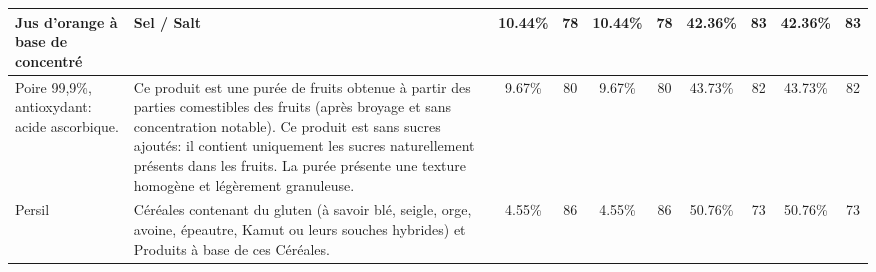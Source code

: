 \begin{tabular}{p{5cm}p{5cm}cccccccc}
                                                                                                                                                                                                                                                         Jus d'orange à base de concentré &                                                    Sel / Salt  &  10.44\% &   78 &  10.44\% &   78 &  42.36\% &   83 &   42.36\% &   83 \\ \hline
                                                                                                                                                                                                                                              Poire 99,9\%, antioxydant: acide ascorbique. &                                    Ce produit est une purée de fruits obtenue à partir des parties comestibles des fruits (après broyage et sans  \newline concentration notable). \newline Ce produit est sans sucres ajoutés: il contient uniquement les sucres naturellement présents dans les fruits. \newline La purée présente une texture homogène et légèrement granuleuse. &   9.67\% &   80 &   9.67\% &   80 &  43.73\% &   82 &   43.73\% &   82 \\ \hline
                                                                                                                                                                                                                                                                                   Persil &                                                                                                                                                                                                           Céréales contenant du gluten (à savoir blé, seigle, orge, avoine, épeautre, Kamut ou leurs souches hybrides) \newline et Produits à base de ces Céréales. &   4.55\% &   86 &   4.55\% &   86 &  50.76\% &   73 &   50.76\% &   73 \\ \hline
\bottomrule
\end{tabular}
